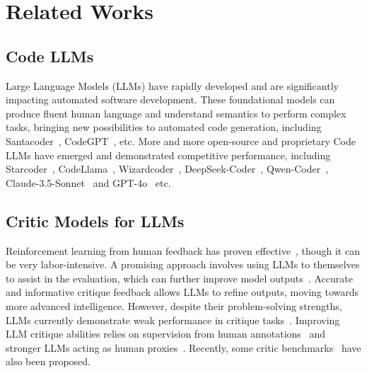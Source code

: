 \section{Related Works}
\subsection{Code LLMs} 

Large Language Models (LLMs) have rapidly developed and are significantly impacting automated software development. These foundational models can produce fluent human language and understand semantics to perform complex tasks, bringing new possibilities to automated code generation, including Santacoder~\cite{allal2023santacoder}, CodeGPT~\cite{lu2021codexglue}, etc. More and more open-source and proprietary Code LLMs have emerged and demonstrated competitive performance, including Starcoder~\cite{li2023starcoder}, CodeLlama~\cite{roziere2023code}, Wizardcoder~\cite{luo2023wizardcoder}, DeepSeek-Coder~\cite{guo2024deepseek}, Qwen-Coder~\cite{hui2024qwen2}, Claude-3.5-Sonnet~\cite{claude_2024} and GPT-4o~\cite{gpt_4o} etc. 

\subsection{Critic Models for LLMs}

Reinforcement learning from human feedback has proven effective~\cite{achiam2023gpt}, though it can be very labor-intensive. A promising approach involves using LLMs to themselves to assist in the evaluation, which can further improve model outputs~\cite{saunders2022self, mcaleese2024llm}. Accurate and informative critique feedback allows LLMs to refine outputs, moving towards more advanced intelligence. However, despite their problem-solving strengths, LLMs currently demonstrate weak performance in critique tasks~\citep{zheng2024critic, yang2024supercorrect}. Improving LLM critique abilities relies on supervision from human annotations~\cite{saunders2022self,mcaleese2024llm} and stronger LLMs acting as human proxies~\cite{lan2024training,zhang2024generative,ke2024critiquellm,ankner2024critique,zheng2024critic,yang2024supercorrect,sharma2024critical}.
Recently, some critic benchmarks~\citep{zheng2024critic,tang2025real} have also been proposed.